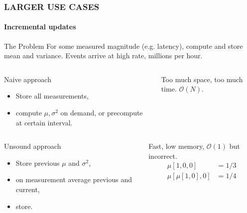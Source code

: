 \documentclass{beamer}
\begin{document}
\begin{frame} \frametitle{LARGER USE CASES}
  \framesubtitle{Incremental updates}
  \begin{block}{The Problem}
    For some measured magnitude (e.g. latency), \alert{compute} and store \alert{mean} and
    \alert{variance.} Events arrive at high rate, \alert{millions per hour.}
  \end{block} \pause
  \begin{columns}[c]
      \begin{block}{Naive approach}
        \begin{itemize}
        \item Store all measurements,
        \item compute \(\mu, \sigma^2\) on demand, or
          precompute at certain interval.
        \end{itemize}
      \end{block}

  Too much \alert{space}, too much \alert{time}. \(\mathcal{O}(N)\).
  \end{columns}

  \pause

  \begin{columns}[c]
      \begin{block}{Unsound approach}
        \begin{itemize}
        \item Store previous \(\mu\) and \(\sigma^2\),
        \item on measurement average previous and current,
        \item store.
        \end{itemize}
      \end{block}

    Fast, low memory, \(\mathcal{O}(1)\) but \alert{incorrect}.
    \begin{align*}
      \mu[1,0,0] & = 1/3 \\
      \mu[\mu[1,0], 0] &= 1/4
    \end{align*}

  \end{columns}

\end{frame}
\end{document}
